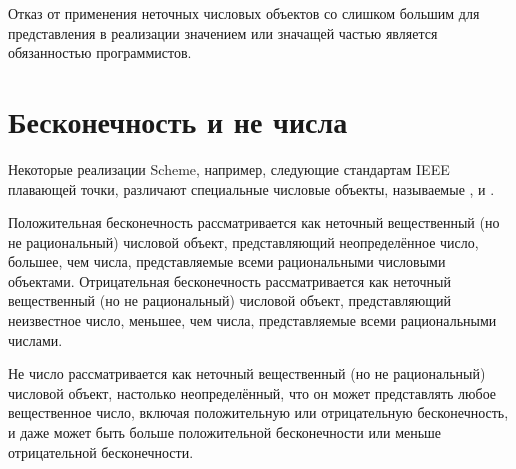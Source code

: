 Отказ от применения неточных числовых объектов со слишком большим для представления в
реализации значением или значащей частью является обязанностью программистов.\vspace{-2mm}

\section{Бесконечность и не числа}

Некоторые реализации Scheme, например, следующие стандартам IEEE плавающей
точки, различают специальные числовые объекты, называемые
,  и .

Положительная бесконечность рассматривается как неточный вещественный (но не рациональный)
числовой объект, представляющий неопределённое число, большее, чем числа, представляемые
всеми рациональными числовыми объектами. Отрицательная бесконечность рассматривается как
неточный вещественный (но не рациональный) числовой объект, представляющий неизвестное
число, меньшее, чем числа, представляемые всеми рациональными числами.

Не число рассматривается как неточный вещественный (но не рациональный) числовой объект, настолько
неопределённый, что он может представлять любое вещественное число, включая положительную или
отрицательную бесконечность, и даже может быть больше положительной бесконечности или
меньше отрицательной бесконечности.\vspace{-5mm}

